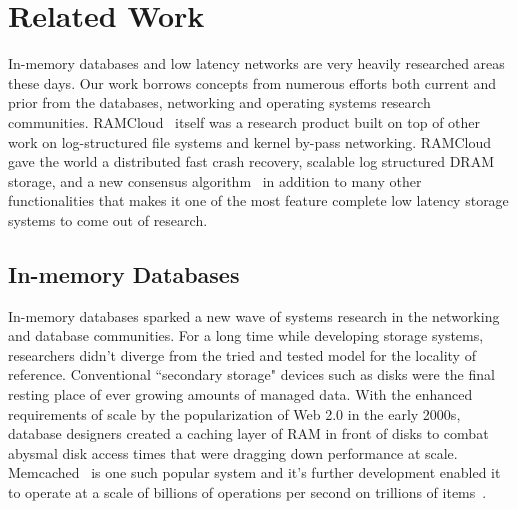 
\chapter{Related Work}
\label{chap:relatedwork}

In-memory databases and low latency networks are very heavily researched areas
these days. Our work borrows concepts from numerous efforts both current and 
prior from the databases, networking and operating systems research communities.
RAMCloud~\cite{ramcloud} itself was a research product built on top of other 
work on log-structured file systems and kernel by-pass networking. RAMCloud gave the 
world a distributed fast crash recovery, scalable log structured DRAM storage, and a new consensus 
algorithm~\cite{ryan-thesis,ongaro2011fast,ramcloudfast,raft} in addition to many other 
functionalities that makes it one of the most feature complete low latency storage systems 
to come out of research.

\section{In-memory Databases}
In-memory databases sparked a new wave of systems research in the 
networking and database communities. For a long time while developing storage
systems, researchers didn't diverge from the  tried and tested model for the 
locality of reference. Conventional ``secondary storage" devices
such as disks were the final resting place of ever growing amounts of managed data. With the 
enhanced requirements of scale by the popularization of Web 2.0 in the early 2000s, 
database designers created a caching layer of RAM in front of disks
to combat abysmal disk access times that were dragging down performance at scale. Memcached~\cite{memcached-orig}
is one such popular system and it's further development
enabled it to operate at a scale of billions of operations per second on trillions of items~\cite{nishtala2013scaling}.

